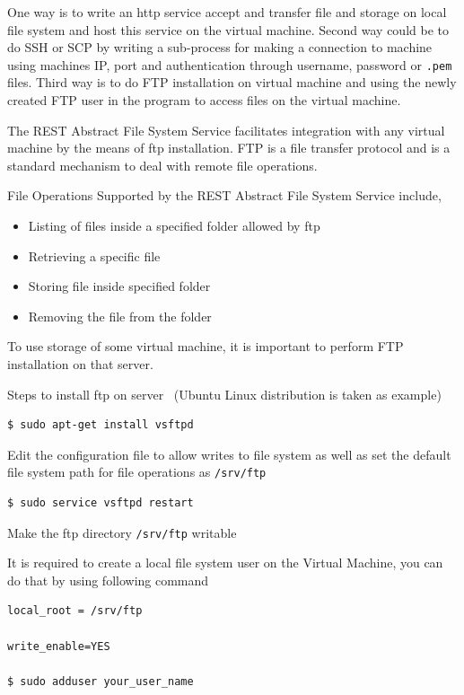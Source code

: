 One way is to write an http service accept and transfer file and
storage on local file system and host this service on the virtual
machine. Second way could be to do SSH or SCP by writing a sub-process
for making a connection to machine using machines IP, port and
authentication through username, password or \verb|.pem| files. Third
way is to do FTP installation on virtual machine and using the newly
created FTP user in the program to access files on the virtual
machine.


The REST Abstract File System Service facilitates integration with any
virtual machine by the means of ftp installation. FTP is a file
transfer protocol and is a standard mechanism to deal with remote file
operations.


File Operations Supported by the REST Abstract File System Service include,
\begin{itemize}
    \item  Listing of files inside a specified folder allowed by ftp
    \item  Retrieving a specific file 
    \item  Storing file inside specified folder
    \item  Removing the file from the folder
\end{itemize}   

To use storage of some virtual machine, it is important to perform 
FTP installation on that server. 

Steps to install ftp on server~\cite{hid-sp18-420-FTP}
(Ubuntu Linux distribution is taken as example)


\begin{verbatim}
$ sudo apt-get install vsftpd
\end{verbatim}

Edit the configuration file to allow writes to file system as well as
set the default file system path for file operations as
\verb|/srv/ftp|

\begin{verbatim}
$ sudo service vsftpd restart
\end{verbatim}



Make the ftp directory \verb|/srv/ftp| writable 


It is required to create a local file system user on the Virtual
Machine, you can do that by using following command

\begin{verbatim}
local_root = /srv/ftp  

write_enable=YES       

$ sudo adduser your_user_name    
\end{verbatim}

